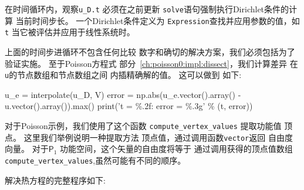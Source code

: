 \begin{notice}[记住用当前时间更新表达式对象!]
在时间循环内，观察\verb!u_D.t! 必须在之前更新
\texttt{solve}语句强制执行Dirichlet条件的计算
当前时间步长。 一个Dirichlet条件定义为
\texttt{Expression}查找并应用参数的值，如\texttt{t}
当它被评估并应用于线性系统时。
\end{notice}

上面的时间步进循环不包含任何比较
数字和确切的解决方案，我们必须包括为了
验证实施。 至于Poisson方程式
部分~\ref{ch:poisson0:impl:dissect}，我们计算差异
在\texttt{u}的节点数组和节点数组之间
内插精确解的值。 这可以做到
如下:

\begin{python}
u_e = interpolate(u_D, V)
error = np.abs(u_e.vector().array() - u.vector().array()).max()
print('t = \%.2f: error = \%.3g' \% (t, error))
\end{python}
对于Poisson示例，我们使用了这个函数
\verb!compute_vertex_values! 提取功能值
顶点。 这里我们举例说明一种提取方法
顶点值，通过调用函数\texttt{vector}返回
自由度向量。 对于$\mathsf{P}_1$
功能空间，这个矢量的自由度将等于
通过调用获得的顶点值数组
\verb!compute_vertex_values!,虽然可能有不同的顺序。

解决热方程的完整程序如下:

